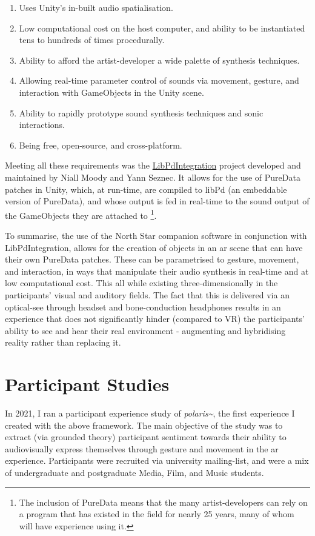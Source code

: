 \begin{enumerate}
    \item Uses Unity's in-built audio spatialisation.
    \item Low computational cost on the host computer, and ability to be instantiated tens to hundreds of times procedurally.
    \item Ability to afford the artist-developer a wide palette of synthesis techniques.
    \item Allowing real-time parameter control of sounds via movement, gesture, and interaction with GameObjects in the Unity scene.
    \item Ability to rapidly prototype sound synthesis techniques and sonic interactions.
    \item Being free, open-source, and cross-platform.
\end{enumerate}

Meeting all these requirements was the \href{https://github.com/LibPdIntegration/LibPdIntegration}{LibPdIntegration} project developed and maintained by Niall Moody and Yann Seznec. It allows for the use of PureData patches in Unity, which, at run-time, are compiled to libPd (an embeddable version of PureData), and whose output is fed in real-time to the sound output of the GameObjects they are attached to  \footnote{The inclusion of PureData means that the many artist-developers can rely on a program that has existed in the field for nearly 25 years, many of whom will have experience using it.}.

To summarise, the use of the North Star companion software in conjunction with LibPdIntegration, allows for the creation of objects in an \ac{ar} scene that can have their own PureData patches. These can be parametrised to gesture, movement, and interaction, in ways that manipulate their audio synthesis in real-time and at low computational cost. This all while existing three-dimensionally in the participants' visual and auditory fields. The fact that this is delivered via an optical-see through headset and bone-conduction headphones results in an experience that does not significantly hinder (compared to VR) the participants' ability to see and hear their real environment - augmenting and hybridising reality rather than replacing it.



\section{Participant Studies}\label{sec: polaris-study}
In 2021, I ran a participant experience study of \textit{polaris\textasciitilde{}}, the first experience I created with the above framework. The main objective of the study was to extract (via grounded theory) participant sentiment towards their ability to audiovisually express themselves through gesture and movement in the \ac{ar} experience. Participants were recruited via university mailing-list, and were a mix of undergraduate and postgraduate Media, Film, and Music students.

